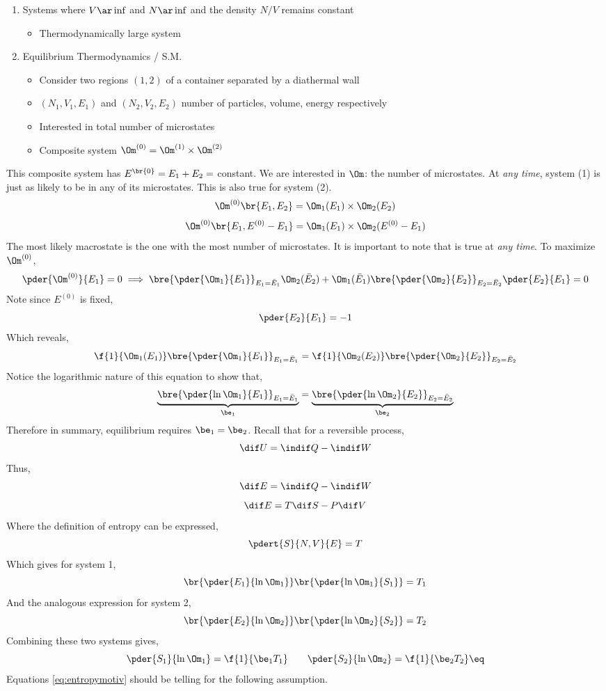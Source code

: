 \documentclass{article}
\begin{document}
\begin{enumerate}
        \item Systems where $V \ar \inf$ and $N \ar \inf$ and the density $N/V$ remains constant
        \begin{itemize}
                \item Thermodynamically large system
        \end{itemize}
        \item Equilibrium Thermodynamics / S.M.
        \begin{itemize}
                \item Consider two regions $(1,2)$ of a container separated by a diathermal wall
                \item $(N_1, V_1, E_1)$ and $(N_2, V_2, E_2)$ number of particles, volume, energy respectively
                \item Interested in total number of microstates
                \item Composite system $\Om^{(0)} = \Om^{(1)} \times \Om^{(2)}$
        \end{itemize}
\end{enumerate}
This composite system has $E^{\br{0}} = E_1 + E_2 = $ constant. We are interested in $\Om$: the number of microstates. At \textit{any time}, system (1) is just as likely to be in any of its microstates. This is also true for system (2).
\[ \Om^{(0)}\br{E_1, E_2} = \Om_1(E_1) \times \Om_2(E_2) \]
\[ \Om^{(0)}\br{E_1, E^{(0)} - E_1} = \Om_1(E_1) \times \Om_2(E^{(0)} - E_1) \]
The most likely macrostate is the one with the most number of microstates. It is important to note that is true at \textit{any time}. To maximize $\Om^{(0)}$,
\[ \pder{\Om^{(0)}}{E_1} = 0 \implies \bre{\pder{\Om_1}{E_1}}_{E_1 = \bar{E}_1} \Om_2(\bar{E}_2) + \Om_1(\bar{E}_1) \bre{\pder{\Om_2}{E_2}}_{E_2 = \bar{E}_2} \pder{E_2}{E_1} = 0 \]
Note since $E^{(0)}$ is fixed,
\[ \pder{E_2}{E_1} = -1 \]
Which reveals,
\[ \f{1}{\Om_1(E_1)} \bre{\pder{\Om_1}{E_1}}_{E_1 = \bar{E}_1} = \f{1}{\Om_2(E_2)} \bre{\pder{\Om_2}{E_2}}_{E_2 = \bar{E}_2} \]
Notice the logarithmic nature of this equation to show that,
\[ \underbrace{\bre{\pder{\ln\Om_1}{E_1}}_{E_1 = \bar{E}_1}}_{\be_1} = \underbrace{\bre{\pder{\ln\Om_2}{E_2}}_{E_2 = \bar{E}_2}}_{\be_2} \]
Therefore in summary, equilibrium requires $\be_1 = \be_2$. Recall that for a reversible process,
\[ \dif U = \indif Q - \indif W \]
Thus,
\[ \dif E = \indif Q - \indif W \]
\[ \dif E = T \dif S - P \dif V \]
Where the definition of entropy can be expressed,
\[ \pdert{S}{N,V}{E} = T \]
Which gives for system 1,
\[ \br{\pder{E_1}{\ln\Om_1}} \br{\pder{\ln\Om_1}{S_1}} = T_1 \]
And the analogous expression for system 2,
\[ \br{\pder{E_2}{\ln\Om_2}} \br{\pder{\ln\Om_2}{S_2}} = T_2 \]
Combining these two systems gives,
\[ \pder{S_1}{\ln\Om_1} = \f{1}{\be_1T_1} \qquad \pder{S_2}{\ln\Om_2} = \f{1}{\be_2T_2} \eq \label{eq:entropymotiv}\]
Equations \eqref{eq:entropymotiv} should be telling for the following assumption. \\
\end{document}
